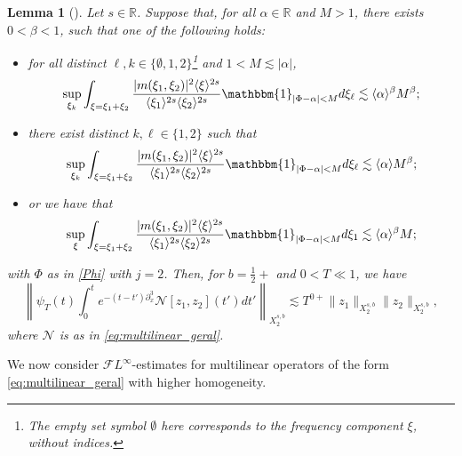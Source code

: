 \documentclass[%
11pt,  reqno]{amsart}
\newcommand{\jap}[1]{\langle #1 \rangle}
\newcommand{\5}{\textup{V}}
\newcommand{\noi}{\noindent}
\newcommand{\FL}{\mathcal{F} L}
\newtheorem{lemma}[theorem]{Lemma}
\theoremstyle{remark}
\newcommand{\R}{\mathbb{R}}
\newcommand{\al}{\alpha}
\renewcommand{\l}{\ell}
\numberwithin{equation}{section}
\numberwithin{theorem}{section}
\newcommand{\Ncal}{\mathcal{N}}
\begin{document}
		
		\begin{lemma}[{\cite[Lemma 3.1]{CLS}}]\label{lem:fre_bi}
            Let $s\in\R$. 
			Suppose that, for all $\al\in \R$ and $M>1$, there exists $0<\beta<1$, such that one of the following holds:
			\begin{itemize}
				\item for all distinct $\l, k\in\{\emptyset,1,2\}$\footnote{The empty set symbol $\emptyset$ here corresponds to the frequency component $\xi$, without indices.}
                and $1<M\lesssim |\alpha|$,
				\begin{equation}\label{eq:frequad}
					\sup_{\xi_k}\int_{\xi=\xi_1+\xi_2}
                    \frac{|m(\xi_1,\xi_2)|^2\jap{\xi}^{2s}}{\jap{\xi_{1}}^{2s}\jap{\xi_{2}}^{2s}}\mathbbm{1}_{|\Phi-\alpha|<M} d\xi_{\l} \lesssim \jap{\alpha}^\beta M^\beta;
				\end{equation}

                
				\item 
                there exist distinct $k, \l\in\{1,2\}$ such that
				\begin{equation}\label{eq:frequad2}
					\sup_{\xi_k}\int_{\xi=\xi_1+\xi_2}
                    \frac{|m(\xi_1,\xi_2)|^2\jap{\xi}^{2s}}{\jap{\xi_{1}}^{2s}\jap{\xi_{2}}^{2s}}\mathbbm{1}_{|\Phi-\alpha|<M} d\xi_{\l}  \lesssim \jap{\alpha} M^\beta;
				\end{equation}
				\item or we have that
				\begin{equation}\label{eq:frequad3}
					\sup_{\xi}\int_{\xi=\xi_1+\xi_2}\frac{|m(\xi_1,\xi_2)|^2\jap{\xi}^{2s}}{\jap{\xi_{1}}^{2s}\jap{\xi_{2}}^{2s}}\mathbbm{1}_{|\Phi-\alpha|<M} d\xi_{1}  \lesssim \jap{\alpha}^\beta M;
				\end{equation}
			\end{itemize}

            \noi with $\Phi$ as in \eqref{Phi} with $j=2$.
			Then, for $b=\frac12+$ and $0<T \ll 1$, we have
			\begin{equation}
				\left\|\psi_T (t)\int_0^te^{-(t-t')\partial_x^3} \Ncal[z_1,z_2](t')dt'\right\|_{X^{s,b}_{2}} \lesssim T^{0+}\|z_1\|_{X^{s,b}_{2}} \|z_2\|_{X^{s,b}_{2}}, 
			\end{equation}
            where $\Ncal$ is as in \eqref{eq:multilinear_geral}.
		\end{lemma}

        
		We now consider $\FL^{\infty}$-estimates for multilinear operators of the form \eqref{eq:multilinear_geral} with higher homogeneity.
		
\end{document}
